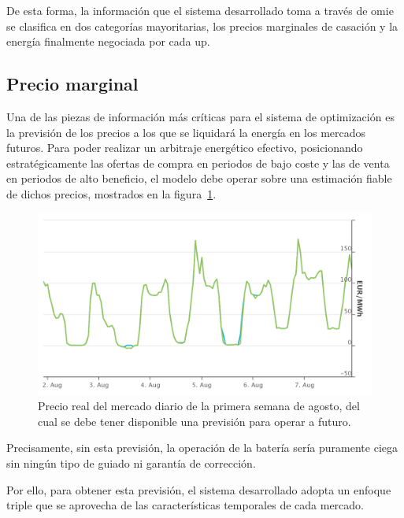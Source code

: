 De esta forma, la información que el sistema desarrollado toma a través de \gls{omie} se clasifica en dos categorías mayoritarias, los precios marginales de casación y la energía finalmente negociada por cada \gls{up}.

\subsection{Precio marginal}
\label{makereference4.1.1}

Una de las piezas de información más críticas para el sistema de optimización es la previsión de los precios a los que se liquidará la energía en los mercados futuros. Para poder realizar un arbitraje energético efectivo, posicionando estratégicamente las ofertas de compra en periodos de bajo coste y las de venta en periodos de alto beneficio, el modelo debe operar sobre una estimación fiable de dichos precios, mostrados en la figura~\ref{fig:mercado-diario}.

\begin{figure}
  \centering
  \includegraphics[width=0.75\linewidth]{figures/mercado-diario.png}
  \caption[Precio del mercado diario de la primera semana de agosto.]{Precio real del mercado diario de la primera semana de agosto, del cual se debe tener disponible una previsión para operar a futuro.}
  \label{fig:mercado-diario}
\end{figure}

Precisamente, sin esta previsión, la operación de la batería sería puramente ciega sin ningún tipo de guiado ni garantía de corrección.

Por ello, para obtener esta previsión, el sistema desarrollado adopta un enfoque triple que se aprovecha de las características temporales de cada mercado.

